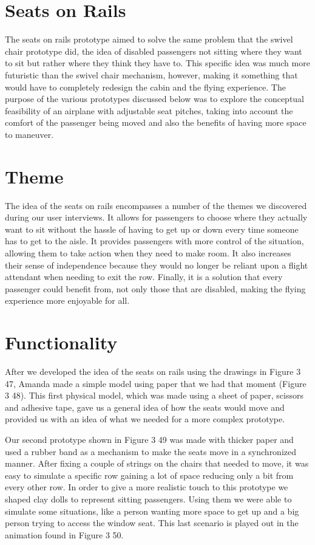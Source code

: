 \documentclass[a4paper, 12pt,conference]{new_cit_thesis}
\begin{document}
\section{Seats on Rails}
The seats on rails prototype aimed to solve the same problem that the swivel chair prototype did, the idea of disabled passengers not sitting where they want to sit but rather where they think they have to. This specific idea was much more futuristic than the swivel chair mechanism, however, making it something that would have to completely redesign the cabin and the flying experience. The purpose of the various prototypes discussed below was to explore the conceptual feasibility of an airplane with adjustable seat pitches, taking into account the comfort of the passenger being moved and also the benefits of having more space to maneuver.

\section*{Theme}
The idea of the seats on rails encompasses a number of the themes we discovered during our user interviews. It allows for passengers to choose where they actually want to sit without the hassle of having to get up or down every time someone has to get to the aisle. It provides passengers with more control of the situation, allowing them to take action when they need to make room. It also increases their sense of independence because they would no longer be reliant upon a flight attendant when needing to exit the row. Finally, it is a solution that every passenger could benefit from, not only those that are disabled, making the flying experience more enjoyable for all.

\section*{Functionality}
After we developed the idea of the seats on rails using the drawings in Figure 3 47, Amanda made a simple model using paper that we had that moment (Figure 3 48). This first physical model, which was made using a sheet of paper, scissors and adhesive tape, gave us a general idea of how the seats would move and provided us with an idea of what we needed for a more complex prototype.

Our second prototype shown in Figure 3 49 was made with thicker paper and used a rubber band as a mechanism to make the seats move in a synchronized manner. After fixing a couple of strings on the chairs that needed to move, it was easy to simulate a specific row gaining a lot of space reducing only a bit from every other row. In order to give a more realistic touch to this prototype we shaped clay dolls to represent sitting passengers. Using them we were able to simulate some situations, like a person wanting more space to get up and a big person trying to access the window seat. This last scenario is played out in the animation found in Figure 3 50.
\end{document}
